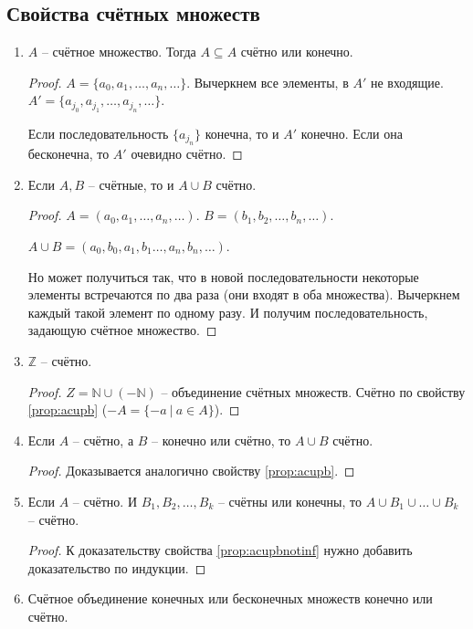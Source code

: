 \documentclass[a4paper, 12pt]{article}
\newcommand{\Z}{\mathbb{Z}}
\newcommand{\N}{\mathbb{N}}
\begin{document}
\subsection*{Свойства счётных множеств}
\begin{enumerate}
        \item
            \label{prop:AsubsetA}
            $A$ -- счётное множество. Тогда $A \subseteq A$ счётно или конечно.
            \begin{proof}
                $A = \{a_0, a_1, \ldots, a_n, \ldots\}$. Вычеркнем все элементы, в $A'$
                не входящие. $A' = \{a_{j_0}, a_{j_1}, \ldots, a_{j_n}, \ldots\}$.

                Если последовательность $\{a_{j_n}\}$ конечна, то и $A'$ конечно.
                Если она бесконечна, то $A'$ очевидно счётно.
            \end{proof}
        \item 
            \label{prop:acupb}
            Если $A,B$ -- счётные, то и $A \cup B$ счётно.
            \begin{proof}
                $A = (a_0, a_1, \ldots, a_n, \ldots)$. 
                $B = (b_1, b_2, \ldots, b_n, \ldots)$.

                $A \cup B = (a_0, b_0, a_1, b_1 \ldots, a_n, b_n, \ldots)$.

                Но может получиться так, что в новой последовательности некоторые элементы
                встречаются по два раза (они входят в оба множества). Вычеркнем
                каждый такой элемент по одному разу. И получим последовательность,
                задающую счётное множество.
            \end{proof}
        \item $\Z$ -- счётно.
            \begin{proof}
                $Z = \N \cup (-\N)$ -- объединение счётных множеств. Счётно по свойству
                \ref{prop:acupb} ($-A = \{-a \ |\ a \in A\}$).
            \end{proof}
        \item 
            \label{prop:acupbnotinf}
            Если $A$ -- счётно, а $B$ -- конечно или счётно, то $A \cup B$ счётно.
            \begin{proof}
                Доказывается аналогично свойству \ref{prop:acupb}.
            \end{proof}
       \item Если $A$ -- счётно. И $B_1, B_2, \ldots, B_k$ -- счётны или конечны, то
            $A \cup B_1 \cup \ldots \cup B_k$ -- счётно.
            \begin{proof}
                К доказательству свойства \ref{prop:acupbnotinf} нужно добавить
                доказательство по индукции.
            \end{proof}
       \item
           \label{prop:Fsetcup}
           Счётное объединение конечных или бесконечных множеств конечно или счётно.


\end{enumerate}
\end{document}
